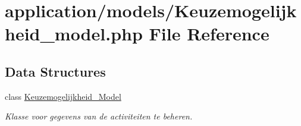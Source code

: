 \hypertarget{_keuzemogelijkheid__model_8php}{}\section{application/models/\+Keuzemogelijkheid\+\_\+model.php File Reference}
\label{_keuzemogelijkheid__model_8php}
\subsection*{Data Structures}
\begin{DoxyCompactItemize}
\item 
class \mbox{\hyperlink{class_keuzemogelijkheid___model}{Keuzemogelijkheid\+\_\+\+Model}}
\begin{DoxyCompactList}\small\item\em Klasse voor gegevens van de activiteiten te beheren. \end{DoxyCompactList}\end{DoxyCompactItemize}
